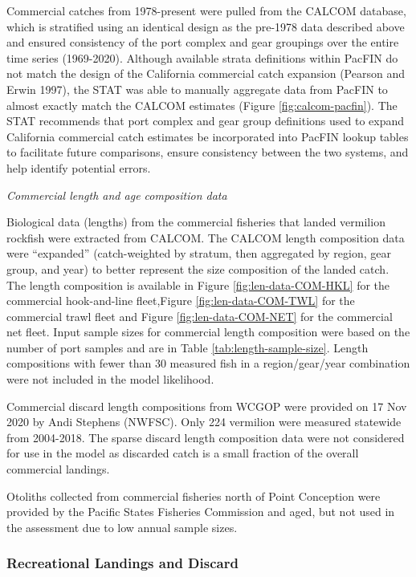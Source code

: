 \documentclass[
  english,
  a4paper,
]{article}
\begin{document}
Commercial catches from 1978-present were pulled from the CALCOM database, which is stratified using an identical design as the pre-1978 data described above and ensured consistency of the port complex and gear groupings over the entire time series (1969-2020). Although available strata definitions within PacFIN do not match the design of the California commercial catch expansion (Pearson and Erwin 1997), the STAT was able to manually aggregate data from PacFIN to almost exactly match the CALCOM estimates (Figure \ref{fig:calcom-pacfin}). The STAT recommends that port complex and gear group definitions used to expand California commercial catch estimates be incorporated into PacFIN lookup tables to facilitate future comparisons, ensure consistency between the two systems, and help identify potential errors.

\emph{Commercial length and age composition data}

Biological data (lengths) from the commercial fisheries that landed vermilion rockfish were extracted
from CALCOM. The CALCOM length composition data were ``expanded'' (catch-weighted by stratum, then aggregated by region, gear group, and year) to better represent the size composition of the landed catch. The length composition is available in Figure \ref{fig:len-data-COM-HKL}
for the commercial hook-and-line fleet,Figure \ref{fig:len-data-COM-TWL} for the commercial trawl fleet and Figure \ref{fig:len-data-COM-NET} for the commercial net fleet.
Input sample sizes for commercial length composition were based on the number of port samples and are in Table \ref{tab:length-sample-size}. Length compositions with fewer than 30 measured fish in a region/gear/year combination were not included in the model likelihood.

Commercial discard length compositions from WCGOP were provided on
17 Nov 2020 by Andi Stephens (NWFSC). Only 224 vermilion were measured statewide from
2004-2018. The sparse discard length composition data were not considered for use in the
model as discarded catch is a small fraction of the overall commercial landings.

Otoliths collected from commercial fisheries north of Point Conception were provided by
the Pacific States Fisheries Commission and aged, but not used in the assessment due
to low annual sample sizes.

\hypertarget{recreational-landings-and-discard}{%
\subsubsection{Recreational Landings and Discard}\label{recreational-landings-and-discard}}
\end{document}

